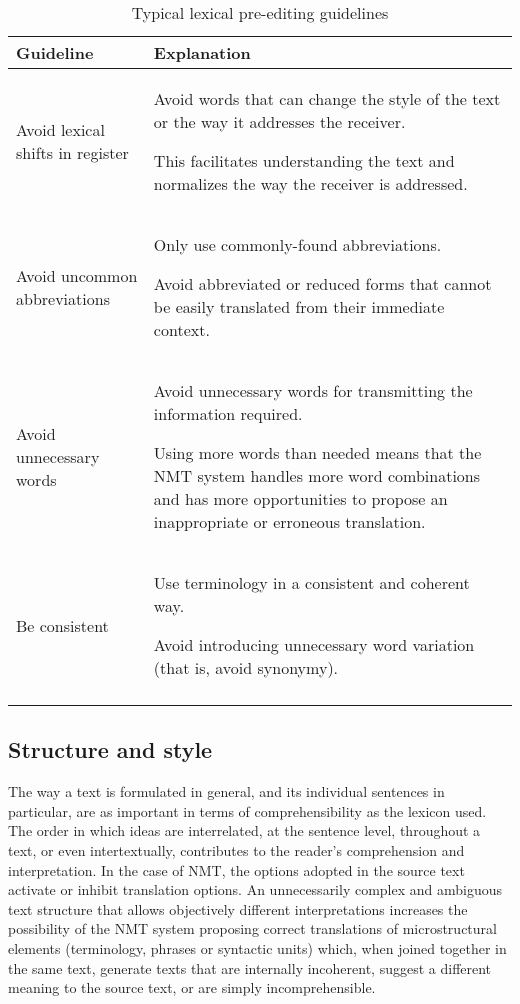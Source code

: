 \documentclass[output=paper,colorlinks,citecolor=brown,
]{langscibook}
\begin{document}
\begin{table}
\begin{tabularx}{\textwidth}{lQ}
\lsptoprule
{Guideline} & {Explanation}\\
\midrule
Avoid lexical shifts in register & Avoid words that can change the style of the text or the way it addresses the receiver.

This facilitates understanding the text and normalizes the way the receiver is addressed.\\
\tablevspace

Avoid uncommon abbreviations & Only use commonly-found abbreviations.

Avoid abbreviated or reduced forms that cannot be easily translated from their immediate context. \\
\tablevspace

Avoid unnecessary words & Avoid unnecessary words for transmitting the information required.

Using more words than needed means that the NMT system handles more word combinations and has more opportunities to propose an inappropriate or erroneous translation. \\
\tablevspace

Be consistent & Use terminology in a consistent and coherent way.

Avoid introducing unnecessary word variation (that is, avoid synonymy).\\
\lspbottomrule
\end{tabularx}
\caption{Typical lexical pre-editing guidelines}
\label{tab:sanchez:1}
\end{table}

\subsection{Structure and style}\largerpage

The way a text is formulated in general, and its individual sentences in particular, are as important in terms of comprehensibility as the lexicon used. The order in which ideas are interrelated, at the sentence level, throughout a text, or even intertextually, contributes to the reader’s comprehension and interpretation. In the case of NMT, the options adopted in the source text activate or inhibit translation options. An unnecessarily complex and ambiguous text structure that allows objectively different interpretations increases the possibility of the NMT system proposing correct translations of microstructural elements (terminology, phrases or syntactic units) which, when joined together in the same text, generate texts that are internally incoherent, suggest a different meaning to the source text, or are simply incomprehensible.
\end{document}
